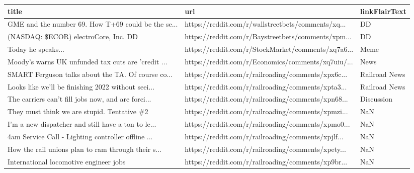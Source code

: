 \documentclass{article}%
\begin{document}
%


\begin{table}[htbp]%
\centering%
\begin{adjustbox}{width=1\textwidth}%
\begin{tabular}{lll}
\toprule
                                             title &                                                url & linkFlairText \\
\midrule
GME and the number 69. How T+69 could be the se... & https://reddit.com/r/wallstreetbets/comments/xq... &            DD \\
            (NASDAQ: \$ECOR) electroCore, Inc. {DD} & https://reddit.com/r/Baystreetbets/comments/xpm... &            DD \\
                                Today he speaks... & https://reddit.com/r/StockMarket/comments/xq7a6... &          Meme \\
Moody's warns UK unfunded tax cuts are 'credit ... & https://reddit.com/r/Economics/comments/xq7uiu/... &          News \\
SMART Ferguson talks about the TA. Of course co... & https://reddit.com/r/railroading/comments/xpx6c... & Railroad News \\
Looks like we'll be finishing 2022 without seei... & https://reddit.com/r/railroading/comments/xpta3... & Railroad News \\
The carriers can't fill jobs now, and are forci... & https://reddit.com/r/railroading/comments/xpn68... &    Discussion \\
       They must think we are stupid. Tentative \#2 & https://reddit.com/r/railroading/comments/xpmzi... &           NaN \\
I’m a new dispatcher and still have a ton to le... & https://reddit.com/r/railroading/comments/xpmo0... &           NaN \\
4am Service Call - Lighting controller offline ... & https://reddit.com/r/railroading/comments/xpjlf... &           NaN \\
How the rail unions plan to ram through their s... & https://reddit.com/r/railroading/comments/xpety... &           NaN \\
            International locomotive engineer jobs & https://reddit.com/r/railroading/comments/xp9br... &           NaN \\
\bottomrule
\end{tabular}
%
\end{adjustbox}%
\end{table}

%
\end{document}
